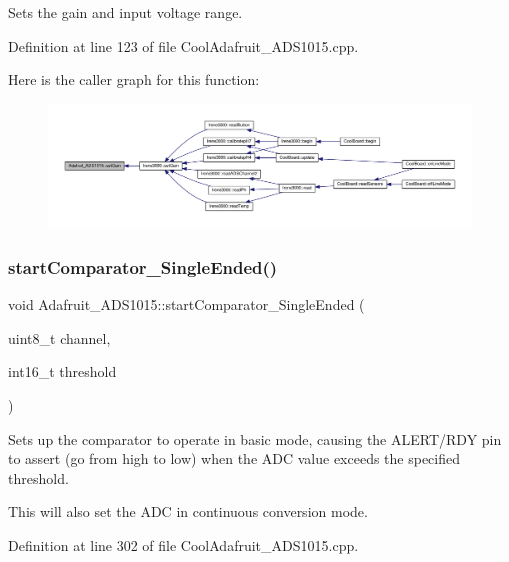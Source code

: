 Sets the gain and input voltage range. 



Definition at line 123 of file Cool\+Adafruit\+\_\+\+A\+D\+S1015.\+cpp.

Here is the caller graph for this function\+:\nopagebreak
\begin{figure}[H]
\begin{center}
\leavevmode
\includegraphics[width=350pt]{class_adafruit___a_d_s1015_a399441eace686975ff22937cbe45cc50_icgraph}
\end{center}
\end{figure}
\mbox{\label{class_adafruit___a_d_s1015_aecd30775d943ea9d9cff0e3485926596}} 
\subsubsection{\texorpdfstring{start\+Comparator\+\_\+\+Single\+Ended()}{startComparator\_SingleEnded()}}
{\footnotesize\ttfamily void Adafruit\+\_\+\+A\+D\+S1015\+::start\+Comparator\+\_\+\+Single\+Ended (\begin{DoxyParamCaption}\item[{uint8\+\_\+t}]{channel,  }\item[{int16\+\_\+t}]{threshold }\end{DoxyParamCaption})}



Sets up the comparator to operate in basic mode, causing the A\+L\+E\+R\+T/\+R\+DY pin to assert (go from high to low) when the A\+DC value exceeds the specified threshold. 

This will also set the A\+DC in continuous conversion mode. 

Definition at line 302 of file Cool\+Adafruit\+\_\+\+A\+D\+S1015.\+cpp.

